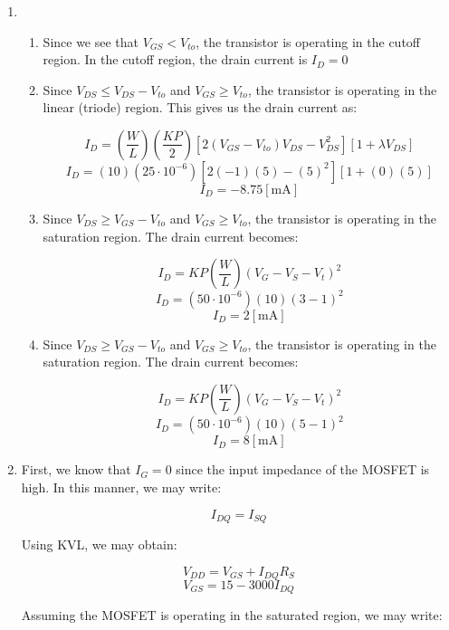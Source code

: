 \begin{enumerate}

  \item

    \begin{enumerate}

      \item Since we see that $V_{GS}<V_{to}$, the transistor is operating in the cutoff region. In the cutoff region, the drain current is $\boxed{I_D=0}$

      \item Since $V_{DS}\leq V_{DS}-V_{to}$ and $V_{GS}\geq V_{to}$, the transistor is operating in the linear (triode) region. This gives us the drain current as:

        $$I_D=\left( \frac{W}{L} \right)\left( \frac{KP}{2} \right)\left[ 2(V_{GS}-V_{to})V_{DS}-V_{DS}^2 \right]\left[ 1+\lambda V_{DS} \right]$$
        $$I_D=\left( 10 \right)\left( 25\cdot10^{-6} \right)\left[ 2(-1)(5)-(5)^2 \right]\left[ 1+(0)(5) \right]$$
        $$\boxed{I_D=-8.75[\si{\milli\ampere}]}$$

      \item Since $V_{DS}\geq V_{GS}-V_{to}$ and $V_{GS}\geq V_{to}$, the transistor is operating in the saturation region. The drain current becomes:

        $$I_{D}=KP\left( \frac{W}{L} \right)(V_{G}-V_{S}-V_t)^2$$
        $$I_{D}=\left( 50\cdot10^{-6} \right)\left( 10 \right)(3-1)^2$$
        $$\boxed{I_{D}=2[\si{\milli\ampere}]}$$

      \item Since $V_{DS}\geq V_{GS}-V_{to}$ and $V_{GS}\geq V_{to}$, the transistor is operating in the saturation region. The drain current becomes:

        $$I_{D}=KP\left( \frac{W}{L} \right)(V_{G}-V_{S}-V_t)^2$$
        $$I_{D}=\left( 50\cdot10^{-6} \right)\left( 10 \right)(5-1)^2$$
        $$\boxed{I_{D}=8[\si{\milli\ampere}]}$$


    \end{enumerate}

  \item First, we know that $I_G=0$ since the input impedance of the MOSFET is high. In this manner, we may write:

    $$I_{DQ}=I_{SQ}$$

    Using KVL, we may obtain:

    $$V_{DD}=V_{GS}+I_{DQ}R_S$$
    $$V_{GS}=15-3000I_{DQ}$$

    Assuming the MOSFET is operating in the saturated region, we may write:


\end{enumerate}
